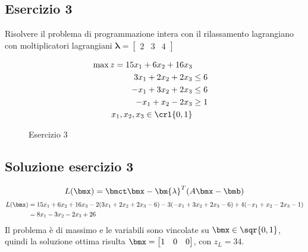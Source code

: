 \documentclass[\main/main.tex]{subfiles}
\begin{document}
\subsection{Esercizio 3}
Risolvere il problema di programmazione intera con il rilassamento lagrangiano con moltiplicatori lagrangiani $\bm{\lambda} = \begin{bmatrix}
		2 & 3 & 4
	\end{bmatrix}$

\begin{figure}
	\begin{align*}
		\max z = 15x_1 + 6x_2 + 16x_3 \\
		3x_1 + 2x_2 + 2x_3 & \leq 6   \\
		-x_1 + 3x_2 + 2x_3 & \leq 6   \\
		-x_1 + x_2 - 2x_3  & \geq 1   \\
		x_1, x_2, x_3 \in \crl{0,1}
	\end{align*}
	\caption{Esercizio 3}
\end{figure}

\subsection{Soluzione esercizio 3}
\[
	L(\bmx)=\bmct\bmx - \bm{\lambda}^T(A\bmx - \bmb)
\]
\begin{align*}
	L(\bmx) & = 15x_1 + 6x_2 + 16x_3 - 2 (3x_1 + 2x_2 + 2x_3-6) - 3(-x_1 + 3x_2 + 2x_3-6) + 4 (-x_1 + x_2 - 2x_3 - 1) \\
	        & = 8x_1 - 3x_2 - 2x_3 + 26
\end{align*}
Il problema è di massimo e le variabili sono vincolate su $\bmx \in \sqr{0,1}$, quindi la soluzione ottima risulta $\bmx = \begin{bmatrix}
		1 & 0 & 0
	\end{bmatrix}$, con $z_L = 34$.
\end{document}
